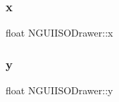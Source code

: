 \subsubsection{\texorpdfstring{x}{x}}
{\footnotesize\ttfamily float N\+G\+U\+I\+I\+S\+O\+Drawer\+::x}

\hypertarget{class_n_g_u_i_i_s_o_drawer_ae5796a5a9d3b27071e6012d8ca70cf25}{}\label{class_n_g_u_i_i_s_o_drawer_ae5796a5a9d3b27071e6012d8ca70cf25} 
\subsubsection{\texorpdfstring{y}{y}}
{\footnotesize\ttfamily float N\+G\+U\+I\+I\+S\+O\+Drawer\+::y}

